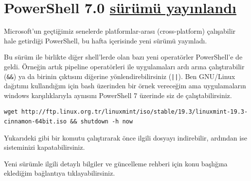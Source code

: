 \documentclass[11pt]{article}
\begin{document}
\section{PowerShell 7.0 \href{https://devblogs.microsoft.com/powershell/announcing-PowerShell-7-0/}{sürümü yayınlandı}}
\label{sec:org38de0e5}
Microsoft'un geçtiğimiz senelerde platformlar-arası (cross-platform)
çalışabilir hale getirdiği PowerShell, bu hafta içerisinde yeni sürümü
yayınladı.

Bu sürüm ile birlikte diğer shell'lerde olan bazı yeni operatörler
PowerShell'e de geldi. Örneğin artık pipeline operatörleri ile uygulamaları
ardı arına çalıştırabilir (\texttt{\&\&}) ya da birinin çıktısını diğerine
yönlendirebilirsiniz (\texttt{||}). Ben GNU/Linux dağıtımı kullandığım için bash
üzerinden bir örnek vereceğim ama uygulamaların windows karşılıklarıyla
aynısını PowerShell 7 üzerinde siz de çalıştabilirsiniz.
\begin{verbatim}
wget http://ftp.linux.org.tr/linuxmint/iso/stable/19.3/linuxmint-19.3-cinnamon-64bit.iso && shutdown -h now
\end{verbatim}
Yukarıdeki gibi bir komutu çalıştırarak önce ilgili dosyayı indirebilir,
ardından ise sisteminizi kapatabilirsiniz.

Yeni sürümle ilgili detaylı bilgiler ve güncelleme rehberi için konu başlığına
eklediğim bağlantıya tıklayabilirsiniz.
\end{document}
